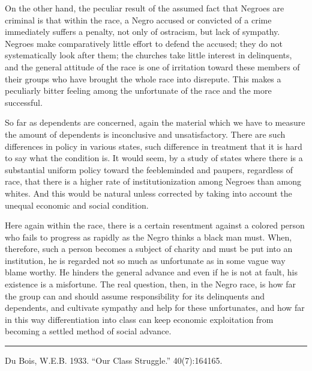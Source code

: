 \documentclass[letterpaper,10pt,english]{jupyterBook}
\begin{document}
\sphinxAtStartPar
On the other hand, the peculiar result of the assumed fact that Negroes are criminal is that within the race, a Negro accused or convicted of a crime immediately suffers a penalty, not only of ostracism, but lack of sympathy. Negroes make comparatively little effort to defend the accused; they do not systematically look after them; the churches take little interest in delinquents, and the general attitude of the race is one of irritation toward these members of their groups who have brought the whole race into disrepute. This makes a peculiarly bitter feeling among the unfortunate of the race and the more successful.

\sphinxAtStartPar
So far as dependents are concerned, again the material which we have to measure the amount of dependents is inconclusive and unsatisfactory. There are such differences in policy in various states, such difference in treatment that it is hard to say what the condition is. It would seem, by a study of states where there is a substantial uniform  policy toward the feeble\sphinxhyphen{}minded and paupers, regardless of race, that there is a higher rate of institutionization among Negroes than among whites. And this would be natural unless corrected by taking into account the unequal economic and social condition.

\sphinxAtStartPar
Here again within the race, there is a certain resentment against a colored person who fails to progress as rapidly as the Negro thinks a black man must. When, therefore, such a person becomes a subject of charity and must be put into an institution, he is regarded not so much as unfortunate as in some vague way blame worthy. He hinders the general advance and even if he is not at fault, his existence is a misfortune. The real question, then, in the Negro race, is how far the group can and should assume responsibility for its delinquents and dependents, and cultivate sympathy and help for these unfortunates, and how far in this way differentiation into class can keep economic exploitation from becoming a settled method of social advance.


\bigskip\hrule\bigskip


\sphinxAtStartPar
{} Du Bois, W.E.B. 1933. “Our Class Struggle.”  40(7):164\sphinxhyphen{}165.
\end{document}
